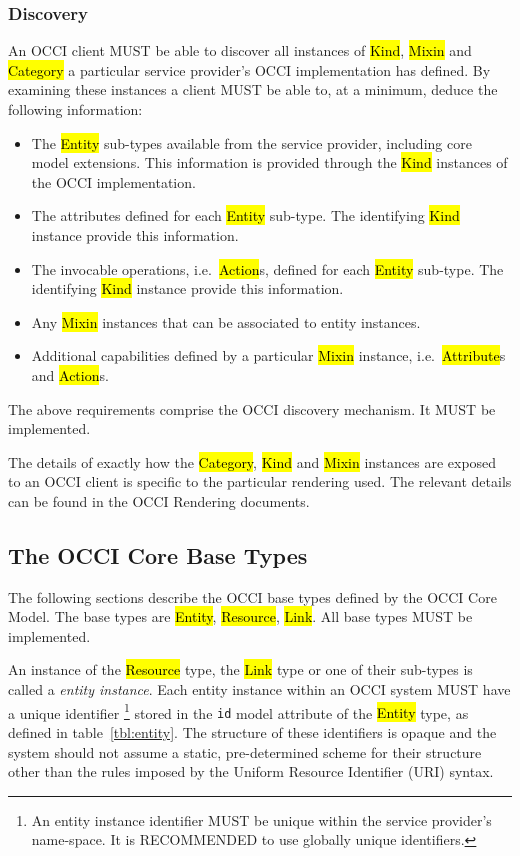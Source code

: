 \documentclass[10pt,a4paper]{article}
\begin{document}
\subsubsection{Discovery}
\label{sec:discovery}
An OCCI client MUST be able to discover all instances of \hl{Kind},
\hl{Mixin} and \hl{Category} a particular service provider's OCCI
implementation has defined. By examining these instances a client MUST
be able to, at a minimum, deduce the following information:
%
\begin{itemize}
  \item The \hl{Entity} sub-types available from the service provider,
    including core model extensions. This information is provided
    through the \hl{Kind} instances of the OCCI implementation.
  \item The attributes defined for each \hl{Entity} sub-type. The
    identifying \hl{Kind} instance provide this information.
  \item The invocable operations, i.e.~\hl{Action}s, defined for each
    \hl{Entity} sub-type. The identifying \hl{Kind} instance provide
    this information.
  \item Any \hl{Mixin} instances that can be associated to entity
    instances.
  \item Additional capabilities defined by a particular \hl{Mixin}
    instance, i.e.~\hl{Attribute}s and \hl{Action}s.
\end{itemize}
%
The above requirements comprise the OCCI discovery mechanism. It MUST
be implemented.

The details of exactly how the \hl{Category}, \hl{Kind} and \hl{Mixin}
instances are exposed to an OCCI client is specific to the particular
rendering used.
The relevant details can be found in the OCCI Rendering documents.

\subsection{The OCCI Core Base Types}
\label{sec:base_types}
The following sections describe the OCCI base types defined by the
OCCI Core Model.  The base types are \hl{Entity}, \hl{Resource},
\hl{Link}. All base types MUST be implemented.

An instance of the \hl{Resource} type, the \hl{Link} type or one of their
sub-types is called a {\em entity instance}.
Each entity instance within an OCCI system MUST have a unique identifier%
\footnote{An entity instance identifier MUST be unique within the service
provider's name-space. It is RECOMMENDED to use globally unique identifiers.}
stored in the {\tt id} model attribute of the \hl{Entity} type, as defined in
table~\ref{tbl:entity}.
%
The structure of these identifiers is opaque and the system should not assume a
static, pre-determined scheme for their structure other than the rules imposed
by the Uniform Resource Identifier (URI) \cite{rfc3986} syntax.
\end{document}
